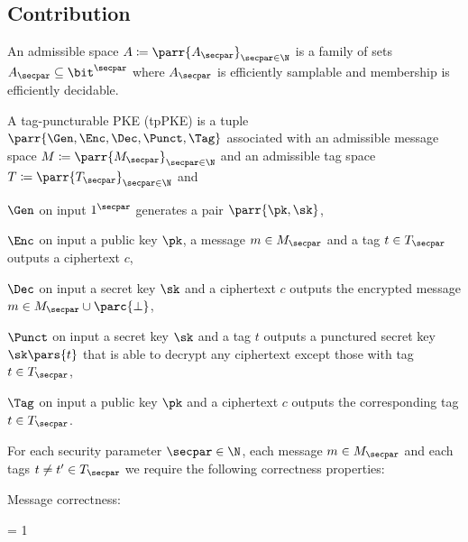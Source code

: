 \subsection{Contribution}
\label{sec:contrib}

\begin{definition}
    An admissible space \(A \coloneqq \parr{A_\secpar}_{\secpar \in \N}\) is a family of sets \(A_\secpar \subseteq \bit^\secpar\) where \(A_\secpar\) is efficiently samplable and membership is efficiently decidable.
\end{definition}

\begin{definition}
    A tag-puncturable PKE (tpPKE) is a tuple \(\parr{\Gen,\Enc,\Dec,\Punct,\Tag}\) associated with an admissible message space \(M \coloneqq \parr{M_\secpar}_{\secpar \in \N}\) and an admissible tag space \(T \coloneqq \parr{T_\secpar}_{\secpar \in \N}\) and
    \begin{sitemize}
        \item \(\Gen\) on input \(1^\secpar\) generates a pair \(\parr{\pk,\sk}\),
        \item \(\Enc\) on input a public key \(\pk\), a message \(m \in M_\secpar\) and a tag \(t \in T_\secpar\) outputs a ciphertext \(c\),
        \item \(\Dec\) on input a secret key \(\sk\) and a ciphertext \(c\) outputs the encrypted message \(m \in M_\secpar \cup \parc{\bot}\),
        \item \(\Punct\) on input a secret key \(\sk\) and a tag \(t\) outputs a punctured secret key \(\sk\pars{t}\) that is able to decrypt any ciphertext except those with tag \(t \in T_\secpar\),
        \item \(\Tag\) on input a public key \(\pk\) and a ciphertext \(c\) outputs the corresponding tag \(t \in T_\secpar\).
    \end{sitemize}
    For each security parameter \(\secpar \in \N\),
    each message \(m \in M_\secpar\) and each tags \(t \neq t' \in T_\secpar\) we require the following correctness properties:
    \begin{sitemize}
        \item Message correctness:
        \begin{bralign}
            = 1
        \end{bralign}


\end{sitemize}
\end{definition}

